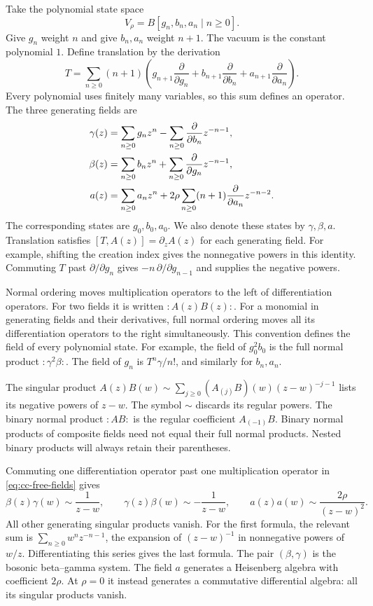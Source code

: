 Take the polynomial state space
\[
 V_\rho=B[g_n,b_n,a_n\mid n\geq0].
\]
Give $g_n$ weight $n$ and give $b_n,a_n$ weight $n+1$.
The vacuum is the constant polynomial $1$.
Define translation by the derivation
\[
 T=\sum_{n\geq0}(n+1)
 \left(g_{n+1}\frac{\partial}{\partial g_n}
       +b_{n+1}\frac{\partial}{\partial b_n}
       +a_{n+1}\frac{\partial}{\partial a_n}\right).
\]
Every polynomial uses finitely many variables, so this sum defines an operator.
The three generating fields are
\begin{align}
 \gamma(z)&=\sum_{n\geq0}g_nz^n
             -\sum_{n\geq0}\frac{\partial}{\partial b_n}z^{-n-1},\label{eq:cc-free-fields}\\
 \beta(z)&=\sum_{n\geq0}b_nz^n
             +\sum_{n\geq0}\frac{\partial}{\partial g_n}z^{-n-1},\notag\\
 a(z)&=\sum_{n\geq0}a_nz^n
             +2\rho\sum_{n\geq0}(n+1)
                \frac{\partial}{\partial a_n}z^{-n-2}.\notag
\end{align}
The corresponding states are $g_0,b_0,a_0$.
We also denote these states by $\gamma,\beta,a$.
Translation satisfies $[T,A(z)]=\partial_zA(z)$ for each generating field.
For example, shifting the creation index gives the nonnegative powers in this identity.
Commuting $T$ past $\partial/\partial g_n$ gives
$-n\,\partial/\partial g_{n-1}$ and supplies the negative powers.

Normal ordering moves multiplication operators to the left of differentiation operators.
For two fields it is written $:A(z)B(z):$.
For a monomial in generating fields and their derivatives, full normal ordering moves all its differentiation operators to the right simultaneously.
This convention defines the field of every polynomial state.
For example, the field of $g_0^2b_0$ is the full normal product $:\gamma^2\beta:$.
The field of $g_n$ is $T^n\gamma/n!$, and similarly for $b_n,a_n$.

The singular product $A(z)B(w)\sim\sum_{j\geq0}(A_{(j)}B)(w)(z-w)^{-j-1}$ lists its negative powers of $z-w$.
The symbol $\sim$ discards its regular powers.
The binary normal product $:AB:$ is the regular coefficient $A_{(-1)}B$.
Binary normal products of composite fields need not equal their full normal products.
Nested binary products will always retain their parentheses.

Commuting one differentiation operator past one multiplication operator in
\eqref{eq:cc-free-fields} gives
\begin{equation}\label{eq:cc-basic-poles}
 \beta(z)\gamma(w)\sim\frac1{z-w},\qquad
 \gamma(z)\beta(w)\sim-\frac1{z-w},\qquad
 a(z)a(w)\sim\frac{2\rho}{(z-w)^2}.
\end{equation}
All other generating singular products vanish.
For the first formula, the relevant sum is
$\sum_{n\geq0}w^nz^{-n-1}$, the expansion of $(z-w)^{-1}$ in nonnegative powers of $w/z$.
Differentiating this series gives the last formula.
The pair $(\beta,\gamma)$ is the bosonic beta--gamma system.
The field $a$ generates a Heisenberg algebra with coefficient $2\rho$.
At $\rho=0$ it instead generates a commutative differential algebra: all its singular products vanish.

